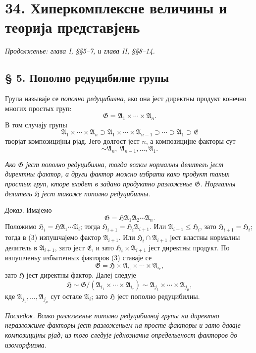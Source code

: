 ﻿\documentclass[11pt]{article}
\providecommand{\mG}{\mathfrak{G}}
\providecommand{\mA}{\mathfrak{A}}
\providecommand{\mE}{\mathfrak{E}}
\providecommand{\mH}{\mathfrak{H}}
\begin{document}
\setcounter{footnote}{0}
\section*{34. Хиперкомплексне величины и теорија представјень}
\emph{Продолженье: глава I, §§5--7, и глава II, §§8--14.}

\subsection*{§ 5. Пополно редуцибилне групы}

Група называје се \emph{пополно редуцибилна}, ако она јест директны продукт конечно многих простых груп:
\[
        \mG=\mA_1\times\cdots\times\mA_n.
\]
В том случају групы
\[
        \mA_1\times\cdots\times\mA_n
        \supset \mA_1\times\cdots\times\mA_{n-1}
        \supset\cdots\supset \mA_1\supset \mE
\]
творјат композицијны рјад. Јего долгост јест $n$, а композицијне факторы сут
\[
        \sim \mA_n,\ \mA_{n-1},\ldots,\mA_1.
\]

\emph{Ако $\mG$ јест пополно редуцибилна, тогда всакы нормалны делитель јест директны фактор, а други фактор можно избрати како продукт такых простых груп, кторе входет в задано продуктно разложенье $\mG$. Нормалны делитель $\mH$ јест такоже пополно редуцибилны.}

\emph{Доказ.} Имајемо
\begin{equation}
        \mG=\mH\mA_1\mA_2\cdots\mA_n.             \tag{3}
\end{equation}
Положимо $\mH_i=\mH\mA_1\cdots\mA_i$; тогда $\mH_{i+1}=\mH_i\mA_{i+1}$. Или $\mA_{i+1}\leq \mH_i$, зато $\mH_{i+1}=\mH_i$; тогда в (3) изпушчајемо фактор $\mA_{i+1}$. Или $\mH_i\cap\mA_{i+1}$ јест властны нормалны делитель в $\mA_{i+1}$, зато јест $\mE$, и зато $\mH_i\times\mA_{i+1}$ јест директны продукт. По изпушченьу избыточных факторов (3) ставаје се
\[
        \mG=\mH\times\mA_{i_1}\times\cdots\times\mA_{i_r},
\]
зато $\mH$ јест директны фактор. Далеј следује
\[
        \mH\sim \mG/(\mA_{i_1}\times\cdots\times\mA_{i_r})
        \sim \mA_{j_1}\times\cdots\times\mA_{j_\mu},
\]
кде $\mA_{j_1},\ldots,\mA_{j_\mu}$ сут остале $\mA_i$; зато $\mH$ јест пополно редуцибилны.

\emph{Последок.} \emph{Всако разложенье пополно редуцибилној групы на директно неразложиме факторы јест разложеньем на просте факторы и зато даваје композицијны рјад; из того следује једнозначна определьеност факторов до изоморфизма.}
\end{document}
